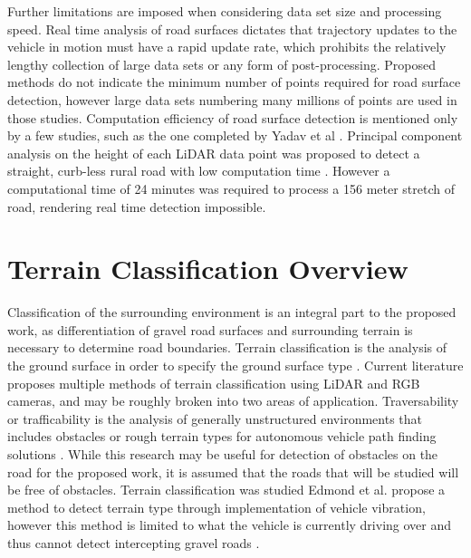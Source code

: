 \documentclass[numbered,pdftex]{ohio-etd}
\begin{document}
{{		{Further limitations are imposed when considering data set size and processing speed. Real time analysis of road surfaces dictates that trajectory updates to the vehicle in motion must have a rapid update rate, which prohibits the relatively lengthy collection of large data sets or any form of post-processing. Proposed methods \cite{yadav_extraction_2017,yadav_road_2018,yadav_rural_2018,yadav_pole-shaped_2015,miyazaki_line-based_2014,yang_semi-automated_2013,liu_new_2013,qiu_fast_2016} do not indicate the minimum number of points required for road surface detection, however large data sets numbering many millions of points are used in those studies. Computation efficiency of road surface detection is mentioned only by a few studies, such as the one completed by Yadav et al \cite{yadav_road_2018}. Principal component analysis on the height of each LiDAR data point was proposed to detect a straight, curb-less rural road with low computation time \cite{yadav_road_2018}. However a computational time of 24 minutes was required to process a 156 meter stretch of road, rendering real time detection impossible.} 
			
	} %
	
%	
%	
	
	\section{Terrain Classification Overview}{
		
		{Classification of the surrounding environment is an integral part to the proposed work, as differentiation of gravel road surfaces and surrounding terrain is necessary to determine road boundaries. Terrain classification is the analysis of the ground surface in order to specify the ground surface type \cite{laible_3d_2012,laible_terrain_2013,laible_map_building,rasmussen_combining_2002,reymann_improving_2015,walas_terrain_2014,wietrzykowski_boosting_2014,wang_road_nodate}. Current literature proposes multiple methods of terrain classification using LiDAR and RGB cameras, and may be roughly broken into two areas of application. Traversability or trafficability is the analysis of generally unstructured environments that includes obstacles or rough terrain types for autonomous vehicle path finding solutions  \cite{schilling_geometric_2017,ojeda_terrain_2006,coombs_driving_2000,stavens_self-supervised_nodate,belter_rough_2010,bartoszyk_terrain-aware_2017,noauthor_fusion_nodate,li_rugged_2019,wilson_terrain_2014,siva_robot_2019}. While this research may be useful for detection of obstacles on the road for the proposed work, it is assumed that the roads that will be studied will be free of obstacles. Terrain classification was studied Edmond et al. propose a method to detect terrain type through implementation of vehicle vibration, however this method is limited to what the vehicle is currently driving over and thus cannot detect intercepting gravel roads \cite{dupont_online_2008}.}
		
}}
\end{document}
